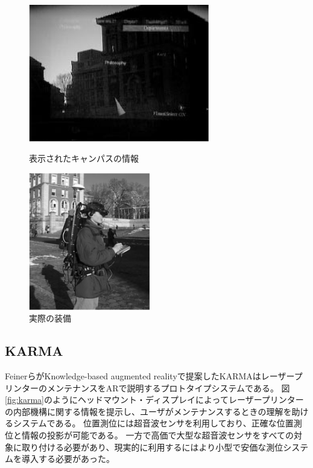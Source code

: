 \begin{figure}[H]
  \begin{minipage}{0.5\hsize}
    \centering 
    \includegraphics[height=60mm]{images/a_touring_machine_ar.png}
    \caption{表示されたキャンパスの情報} \label{fig:a_touring_machine_ar}
  \end{minipage}
  \begin{minipage}{0.5\hsize}
    \centering 
    \includegraphics[height=60mm]{images/a_touring_machine_pc.png}
    \caption{実際の装備} \label{fig:a_touring_machine_pc}
  \end{minipage}
\end{figure}


\subsection{KARMA}
FeinerらがKnowledge-based augmented reality\cite{10.1145/159544.159587}で提案したKARMAはレーザープリンターのメンテナンスをARで説明するプロトタイプシステムである。
図\ref{fig:karma}のようにヘッドマウント・ディスプレイによってレーザープリンターの内部機構に関する情報を提示し、ユーザがメンテナンスするときの理解を助けるシステムである。
位置測位には超音波センサを利用しており、正確な位置測位と情報の投影が可能である。
一方で高価で大型な超音波センサをすべての対象に取り付ける必要があり、現実的に利用するにはより小型で安価な測位システムを導入する必要があった。

